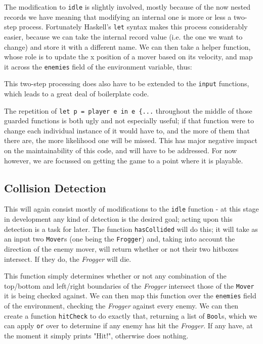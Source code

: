\documentclass[12pt, a4paper]{report}
\begin{document}
The modification to \verb|idle| is slightly involved, mostly because of the now nested records we have meaning that modifying an internal one is more or less a two-step process.
Fortunately Haskell's \verb|let| syntax makes this process considerably easier, because we can take the internal record value (i.e. the one we want to change) and store it with a different name.
We can then take a helper function, whose role is to update the x position of a mover based on its velocity, and map it across the \verb|enemies| field of the environment variable, thus:

This two-step processing does also have to be extended to the \verb|input| functions, which leads to a great deal of boilerplate code.

The repetition of \verb|let p = player e in e {...| throughout the middle of those guarded functions is both ugly and not especially useful; if that function were to change each individual instance of it would have to, and the more of them that there are, the more likelihood one will be missed.
This has major negative impact on the maintainability of this code, and will have to be addressed.
For now however, we are focussed on getting the game to a point where it is playable.

\subsection{Collision Detection}

This will again consist mostly of modifications to the \verb|idle| function - at this stage in development any kind of detection is the desired goal; acting upon this detection is a task for later.
The function \verb|hasCollided| will do this; it will take as an input two \verb|Mover|s (one being the \verb|Frogger|) and, taking into account the direction of the enemy mover, will return whether or not their two hitboxes intersect.
If they do, the \textit{Frogger} will die.

This function simply determines whether or not any combination of the top/bottom and left/right boundaries of the \textit{Frogger} intersect those of the \verb|Mover| it is being checked against.
We can then map this function over the \verb|enemies| field of the environment, checking the \textit{Frogger} against every enemy.
We can then create a function \verb|hitCheck| to do exactly that, returning a list of \verb|Bool|s, which we can apply \verb|or| over to determine if any enemy has hit the \textit{Frogger}.
If any have, at the moment it simply prints "Hit!", otherwise does nothing.
\end{document}
